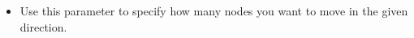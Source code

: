 % 
\begin{itemize}
\item Use this parameter to specify how many nodes you want to move in the given direction.  
\end{itemize}
